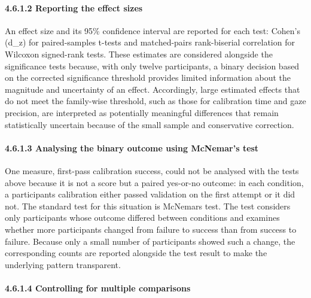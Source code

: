 \documentclass[
]{article}
\begin{document}
\hypertarget{step-2-reporting-the-effect-sizes}{%
\paragraph{4.6.1.2 Reporting the effect sizes}\label{step-2-reporting-the-effect-sizes}}

An effect size and its 95\% confidence interval are reported for each test: Cohen's (d\_z) for paired-samples t-tests and matched-pairs rank-biserial correlation for Wilcoxon signed-rank tests. These estimates are considered alongside the significance tests because, with only twelve participants, a binary decision based on the corrected significance threshold provides limited information about the magnitude and uncertainty of an effect. Accordingly, large estimated effects that do not meet the family-wise threshold, such as those for calibration time and gaze precision, are interpreted as potentially meaningful differences that remain statistically uncertain because of the small sample and conservative correction.

\hypertarget{step-3-analysing-the-binary-outcome-using-mcnemars-test}{%
\paragraph{4.6.1.3 Analysing the binary outcome using McNemar's test}\label{step-3-analysing-the-binary-outcome-using-mcnemars-test}}

One measure, first-pass calibration success, could not be analysed with the tests above because it is not a score but a paired yes-or-no outcome: in each condition, a participant\textquotesingle s calibration either passed validation on the first attempt or it did not. The standard test for this situation is McNemar\textquotesingle s test. The test considers only participants whose outcome differed between conditions and examines whether more participants changed from failure to success than from success to failure. Because only a small number of participants showed such a change, the corresponding counts are reported alongside the test result to make the underlying pattern transparent.

\hypertarget{step-4-controlling-for-multiple-comparisons}{%
\paragraph{4.6.1.4 Controlling for multiple comparisons}\label{step-4-controlling-for-multiple-comparisons}}
\end{document}
